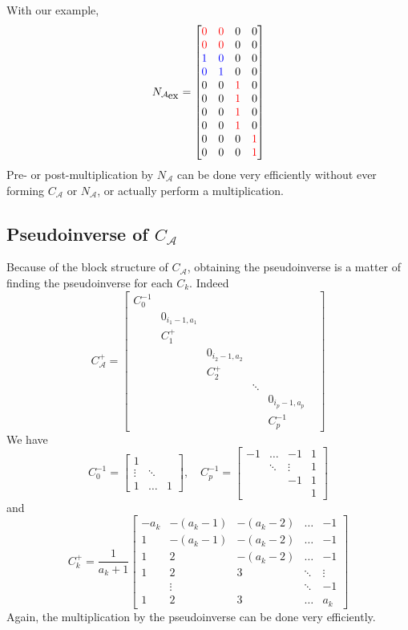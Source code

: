 \documentclass[]{article}
\newcommand{\BIN}{\begin{bmatrix}}
\newcommand{\BOUT}{\end{bmatrix}}
\newcommand{\cred}[1]{\textcolor{red}{#1}}
\newcommand{\cblue}[1]{\textcolor{blue}{#1}}
\begin{document}
With our example,
\begin{equation}
N_{\mathcal{A}_{\mbox{\small ex}}} = \BIN              
  \cred{0} & \cred{0} & 0 & 0 \\
  \cred{0} & \cred{0} & 0 & 0 \\
  \cblue{1} & \cblue{0} & 0 & 0 \\
  \cblue{0} & \cblue{1} & 0 & 0 \\
  0 & 0 & \cred{1} & 0 \\
  0 & 0 & \cred{1} & 0 \\
  0 & 0 & \cred{1} & 0 \\
  0 & 0 & \cred{1} & 0 \\
  0 & 0 & 0 & \cred{1} \\
  0 & 0 & 0 & \cred{1} \\
\BOUT
\end{equation}
Pre- or post-multiplication by $N_{\mathcal{A}}$ can be done very efficiently without ever forming $C_{\mathcal{A}}$ or $N_{\mathcal{A}}$, or actually perform a multiplication.

\subsection{Pseudoinverse of $C_{\mathcal{A}}$}
Because of the block structure of $C_{\mathcal{A}}$, obtaining the pseudoinverse is a matter of finding the pseudoinverse for each $C_k$. Indeed
\begin{equation}
  C_{\mathcal{A}}^+ = \BIN
    C_0^{-1} & & & & \\
    & 0_{i_1-1,a_1} & & & \\
    & C_1^+& & &\\
    && 0_{i_2-1,a_2} & & & \\
    && C_2^+&  & &\\
    &&& \ddots & \\
    &&&&0_{i_p-1,a_p} \\
    &&&& C_p^{-1}
  \BOUT
\end{equation}
We have
\begin{equation}
  C_0^{-1} = \BIN 
    1 &   & \\
    \vdots & \ddots & \\
    1 & \ldots & 1 \BOUT, \quad 
  C_p^{-1} = \BIN 
    -1 & \ldots & -1 & 1 \\
       & \ddots & \vdots & 1\\
       &        &  -1   & 1 \\
       &&& 1 \BOUT
\end{equation}
and
\begin{equation}
 C_k^+ = \frac{1}{a_k+1} \BIN
   -a_k & -(a_k-1) & -(a_k-2) & \ldots & -1 \\
     1  & -(a_k-1) & -(a_k-2) & \ldots & -1 \\
     1  &    2     & -(a_k-2) & \ldots & -1 \\
     1  &    2     &    3     & \ddots & \vdots \\
        & \vdots   &          & \ddots & -1 \\
     1  &    2     &    3     & \ldots & a_k
 \BOUT
\end{equation}
Again, the multiplication by the pseudoinverse can be done very efficiently.
\end{document}
